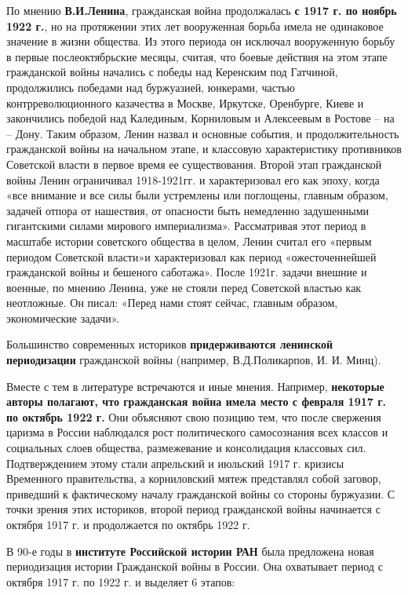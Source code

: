 \documentclass{article}
\begin{document}
\hfill

По мнению \textbf{В.И.Ленина}, гражданская война продолжалась \textbf{с 1917 г. по ноябрь 1922 г.}, но на протяжении этих лет вооруженная борьба имела не одинаковое значение в жизни общества. Из этого периода он исключал вооруженную борьбу в первые послеоктябрьские месяцы, считая, что боевые действия на этом этапе гражданской войны начались с победы над Керенским под Гатчиной, продолжились победами над буржуазией, юнкерами, частью контрреволюционного казачества в Москве, Иркутске, Оренбурге, Киеве и закончились победой над Калединым, Корниловым и Алексеевым в Ростове – на – Дону. Таким образом, Ленин назвал и основные события, и продолжительность гражданской войны на начальном этапе, и классовую характеристику противников Советской власти в первое время ее существования. Второй этап гражданской войны Ленин ограничивал 1918-1921гг. и характеризовал его как эпоху, когда «все внимание и все силы были устремлены или поглощены, главным образом, задачей отпора от нашествия, от опасности быть немедленно задушенными гигантскими силами мирового империализма». Рассматривая этот период в масштабе истории советского общества в целом, Ленин считал его «первым периодом Советской власти»и характеризовал как период «ожесточеннейшей гражданской войны и бешеного саботажа». После 1921г. задачи внешние и военные, по мнению Ленина, уже не стояли перед Советской властью как неотложные. Он писал: «Перед нами стоят сейчас, главным образом, экономические задачи».

Большинство современных историков \textbf{придерживаются ленинской периодизации} гражданской войны (например, В.Д.Поликарпов, И. И. Минц).

\hfill

Вместе с тем в литературе встречаются и иные мнения. Например, \textbf{некоторые авторы полагают, что гражданская война имела место с февраля 1917 г. по октябрь 1922 г.} Они объясняют свою позицию тем, что после свержения царизма в России наблюдался рост политического самосознания всех классов и социальных слоев общества, размежевание и консолидация классовых сил. Подтверждением этому стали апрельский и июльский 1917 г. кризисы Временного правительства, а корниловский мятеж представлял собой заговор, приведший к фактическому началу гражданской войны со стороны буржуазии. С точки зрения этих историков, второй период гражданской войны начинается с октября 1917 г. и продолжается по октябрь 1922 г.

\hfill

В 90-е годы в \textbf{институте Российской истории РАН} была предложена новая периодизация истории Гражданской войны в России. Она охватывает период с октября 1917 г. по 1922 г. и выделяет 6 этапов:
\end{document}
